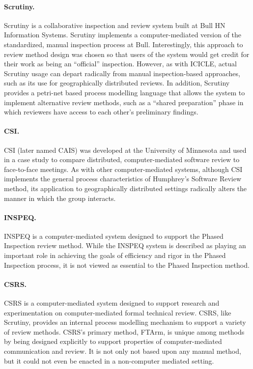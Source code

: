 \paragraph {Scrutiny.}
Scrutiny \cite{Gintell93} is a collaborative inspection
and review system built at Bull HN Information Systems. Scrutiny implements
a computer-mediated version of the standardized, manual inspection process
at Bull. Interestingly, this approach to review method design was chosen so
that users of the system would get credit for their work as being an
``official'' inspection.  However, as with ICICLE, actual Scrutiny usage
can depart radically from manual inspection-based approaches, such as its
use for geographically distributed reviews. In addition, Scrutiny provides
a petri-net based process modelling language that allows the system to
implement alternative review methods, such as a ``shared preparation''
phase in which reviewers have access to each other's preliminary findings.

\paragraph{CSI.}
CSI \cite{Mashayekhi94} (later named CAIS) was developed at
the University of Minnesota and used in a case study to compare
distributed, computer-mediated software review to face-to-face meetings.
As with other computer-mediated systems, although CSI implements the 
general process characteristics of Humphrey's Software Review method, 
its application to geographically distributed settings radically alters
the manner in which the group interacts. 


\paragraph {INSPEQ.}
INSPEQ \cite{Knight93} is a computer-mediated system
designed to support the Phased Inspection review method. While the INSPEQ system
is described as playing an important role in achieving the goals of
efficiency and rigor in the Phased Inspection process, it is not 
viewed as essential
to the Phased Inspection method.

\paragraph {CSRS.}
CSRS \cite{Johnson94} is a
computer-mediated system designed to support research and experimentation
on computer-mediated formal technical review. CSRS, like Scrutiny, provides
an internal process modelling mechanism to support a variety of review
methods. CSRS's primary method,  FTArm, is unique among methods by being
designed explicitly to support properties of computer-mediated
communication and review. It is not only not based upon any manual method,
but it could not even be enacted in a non-computer mediated setting. 


